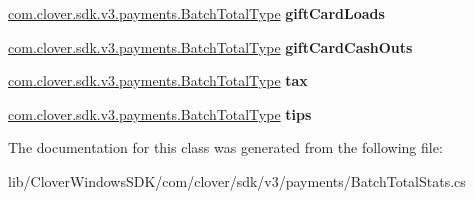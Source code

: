 \begin{DoxyCompactItemize}
\hyperlink{classcom_1_1clover_1_1sdk_1_1v3_1_1payments_1_1_batch_total_type}{com.\+clover.\+sdk.\+v3.\+payments.\+Batch\+Total\+Type} {\bfseries gift\+Card\+Loads}
\item 
\mbox{\label{classcom_1_1clover_1_1sdk_1_1v3_1_1payments_1_1_batch_total_stats_ae52561b0f81aeae3c505715ec32deedd}} 
\hyperlink{classcom_1_1clover_1_1sdk_1_1v3_1_1payments_1_1_batch_total_type}{com.\+clover.\+sdk.\+v3.\+payments.\+Batch\+Total\+Type} {\bfseries gift\+Card\+Cash\+Outs}
\item 
\mbox{\label{classcom_1_1clover_1_1sdk_1_1v3_1_1payments_1_1_batch_total_stats_adcbff36c14e2508612798a87a9c16ac5}} 
\hyperlink{classcom_1_1clover_1_1sdk_1_1v3_1_1payments_1_1_batch_total_type}{com.\+clover.\+sdk.\+v3.\+payments.\+Batch\+Total\+Type} {\bfseries tax}
\item 
\mbox{\label{classcom_1_1clover_1_1sdk_1_1v3_1_1payments_1_1_batch_total_stats_aa829bb717b68c7522b6a27941c224509}} 
\hyperlink{classcom_1_1clover_1_1sdk_1_1v3_1_1payments_1_1_batch_total_type}{com.\+clover.\+sdk.\+v3.\+payments.\+Batch\+Total\+Type} {\bfseries tips}
\end{DoxyCompactItemize}


The documentation for this class was generated from the following file\+:\begin{DoxyCompactItemize}
\item 
lib/\+Clover\+Windows\+S\+D\+K/com/clover/sdk/v3/payments/Batch\+Total\+Stats.\+cs\end{DoxyCompactItemize}
